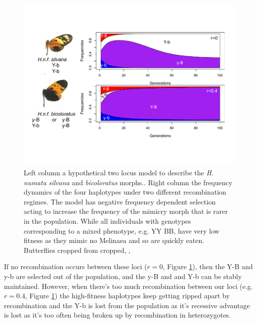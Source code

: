 \begin{figure} %
\begin{center}
 \includegraphics[width = \textwidth]{figures/selection_recom_interaction/H_numata_two_loc_freqs.pdf}
\end{center}
\caption{Left column a hypothetical two locus model to describe the {\it H. numata} {\it silvana} and {\it  bicoloratus} morphs.. Right column the frequency dynamics of the four haplotypes under two different recombination regimes. The model has negative frequency dependent selection acting to increase the frequency of the mimicry morph that is rarer in the population. While all individuals with genotypes corresponding to a mixed phenotype, e.g. YY BB, have very low fitness as they mimic no Melinaea and so are quickly eaten.   Butterflies cropped from \citet{joron2006conserved} cropped, \PLOSccBY,  } \label{fig:numata_two_loc_freqs}  %
\end{figure}

If no recombination occurs between these loci ($r=0$, Figure \ref{fig:numata_two_loc_freqs}), then the Y-B and y-b are selected out of the population, and the y-B and and  Y-b can be stably maintained. However, when there's too much recombination between our loci (e.g. $r=0.4$, Figure \ref{fig:numata_two_loc_freqs}) the high-fitness haplotypes keep getting ripped apart by recombination and the Y-b is lost from the population as it's recessive advantage is lost as it's too often being broken up by recombination in heterozygotes.

